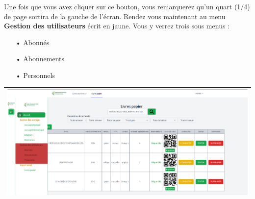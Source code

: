 \documentclass[12pt,a4paper]{article}
\begin{document}
Une fois que vous avez cliquer sur ce bouton, vous remarquerez qu'un quart (1/4) de page 
sortira de la gauche de l'écran. Rendez vous maintenant au menu \textbf{Gestion des
utilisateurs} écrit en jaune. Vous y verrez trois sous menus :
\begin{itemize}
\item[•] Abonnés
\item[•] Abonnements
\item[•] Personnels
\end{itemize}

\begin{center}
\begin{tabular}{|p{17cm}|}
\hline 
\includegraphics[width=\textwidth]{img/gestion_utilisateurs2.png} \\ 
\hline 
\end{tabular} 
\end{center}
\end{document}

